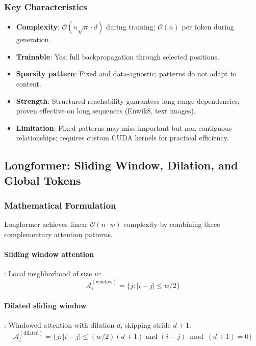 \subsubsection{Key Characteristics}

\begin{itemize}[leftmargin=*]
    \item \textbf{Complexity}: $\mathcal{O}(n\sqrt{n} \cdot d)$ during training; $\mathcal{O}(n)$ per token during generation.
    \item \textbf{Trainable}: Yes; full backpropagation through selected positions.
    \item \textbf{Sparsity pattern}: Fixed and data-agnostic; patterns do not adapt to content.
    \item \textbf{Strength}: Structured reachability guarantees long-range dependencies; proven effective on long sequences (Enwik8, text images).
    \item \textbf{Limitation}: Fixed patterns may miss important but non-contiguous relationships; requires custom CUDA kernels for practical efficiency.
\end{itemize}

\subsection{Longformer: Sliding Window, Dilation, and Global Tokens}

\subsubsection{Mathematical Formulation}

Longformer \citep{beltagy_longformer_2020} achieves linear $\mathcal{O}(n \cdot w)$ complexity by combining three complementary attention patterns.

\paragraph{Sliding window attention}: Local neighborhood of size $w$:
\[
\mathcal{A}_i^{(\text{window})} = \{j : |i - j| \leq w/2\}
\]

\paragraph{Dilated sliding window}: Windowed attention with dilation $d$, skipping stride $d+1$:
\[
\mathcal{A}_i^{(\text{dilated})} = \{j : |i - j| \leq (w/2)(d+1) \text{ and } (i-j) \bmod (d+1) = 0\}
\]

